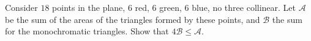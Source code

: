 Consider $18$ points in the plane, $6$ red, $6$ green, $6$ blue, no three collinear. Let $\mathcal{A}$ be the sum of the areas of the triangles formed by these points, and $\mathcal{B}$ the sum for the monochromatic triangles. Show that $4\mathcal{B} \leq \mathcal{A}$.
